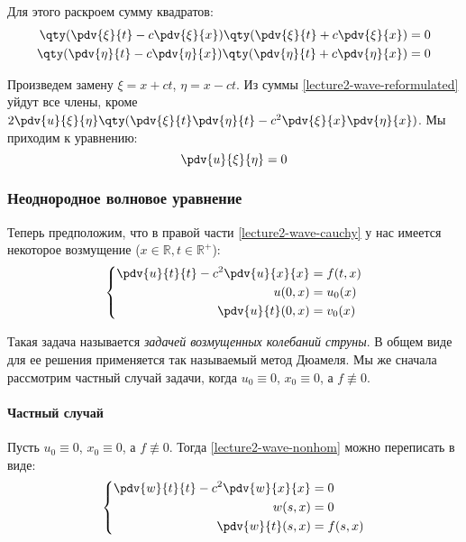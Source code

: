 Для этого раскроем сумму квадратов:
%
\begin{align*}
  \qty(\pdv{\xi}{t} - c \pdv{\xi}{x}) \qty(\pdv{\xi}{t} + c \pdv{\xi}{x}) = 0 \\
  \qty(\pdv{\eta}{t} - c \pdv{\eta}{x}) \qty(\pdv{\eta}{t} + c \pdv{\eta}{x}) = 0
\end{align*}


Произведем замену $\xi = x + ct$, $\eta = x - ct$. Из суммы \eqref{lecture2-wave-reformulated} уйдут все члены, кроме $ 2 \pdv{u}{\xi}{\eta} \qty(\pdv{\xi}{t} \pdv{\eta}{t} - c^2 \pdv{\xi}{x} \pdv{\eta}{x})$. Мы  приходим к уравнению:
\begin{equation}
  \pdv{u}{\xi}{\eta} = 0
\end{equation}


\subsubsection{Неоднородное волновое уравнение}

Теперь предположим, что в правой части \eqref{lecture2-wave-cauchy} у нас имеется некоторое возмущение ($x \in \mathbb{R}, t \in \mathbb{R}^+$):
%
\begin{equation}
  \left\{\begin{aligned}
    \pdv{u}{t}{t} - c^2 \pdv{u}{x}{x} &= f(t, x) \\
    u(0, x) &= u_0(x) \\
    \pdv{u}{t} (0, x) &= v_0(x)
  \end{aligned}\right.
  \label{lecture2-wave-nonhom}
\end{equation}

Такая задача называется \emph{задачей возмущенных колебаний струны}. В общем виде для ее решения применяется так называемый метод Дюамеля. Мы же сначала рассмотрим частный случай задачи, когда $u_0 \equiv 0$, $x_0 \equiv 0$, а $f \not\equiv 0$.

\paragraph{Частный случай}

Пусть $u_0 \equiv 0$, $x_0 \equiv 0$, а $f \not\equiv 0$. Тогда \eqref{lecture2-wave-nonhom} можно переписать в виде:
%
\begin{equation}
  \left\{\begin{aligned}
    \pdv{w}{t}{t} - c^2 \pdv{w}{x}{x} &= 0 \\
    w(s, x) &= 0 \\
    \pdv{w}{t} (s, x) &= f(s, x)
  \end{aligned}\right.
  \label{lecture2-problem-s}
\end{equation}

